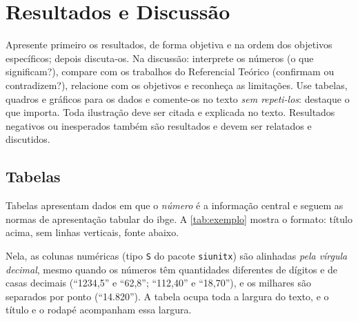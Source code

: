 \chapter{Resultados e Discussão}\label{sec:resultados}

\begin{dica}
Apresente primeiro os resultados, de forma objetiva e na ordem dos objetivos
específicos; depois discuta-os. Na discussão: interprete os números (o que significam?),
compare com os trabalhos do Referencial Teórico (confirmam ou contradizem?), relacione
com os objetivos e reconheça as limitações. Use tabelas, quadros e gráficos para os
dados e comente-os no texto \emph{sem repeti-los}: destaque o que importa. Toda
ilustração deve ser citada e explicada no texto. Resultados negativos ou inesperados
também são resultados e devem ser relatados e discutidos.
\end{dica}

\section{Tabelas}

Tabelas apresentam dados em que o \emph{número} é a informação central e seguem as
normas de apresentação tabular do \ac{ibge}. A \autoref{tab:exemplo} mostra o formato:
título acima, sem linhas verticais, fonte abaixo.

Nela, as colunas numéricas (tipo \texttt{S} do pacote \texttt{siunitx})
são alinhadas \emph{pela vírgula decimal}, mesmo quando os números têm quantidades
diferentes de dígitos e de casas decimais (``1234,5'' e ``62,8''; ``112,40'' e ``18,70''),
e os milhares são separados por ponto (``14.820''). A tabela ocupa toda a largura do
texto, e o título e o rodapé acompanham essa largura.


